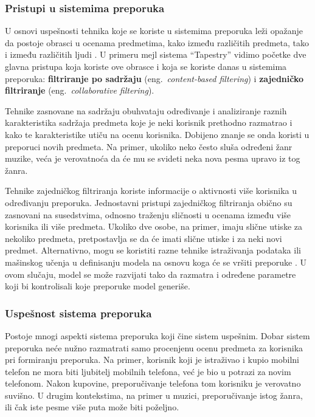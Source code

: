 \documentclass[a4paper]{article}
\begin{document}
\subsubsection{Pristupi u sistemima preporuka}
\label{subsubsec:pristupi_sistema_preporuka}

U osnovi uspešnosti tehnika koje se koriste u sistemima preporuka leži opažanje da postoje obrasci u ocenama predmetima, kako između različitih predmeta, tako i između različitih ljudi \cite{aggarwal_recommender_2016}. U primeru mejl sistema ``Tapestry'' vidimo početke dve glavna pristupa koja koriste ove obrasce i koja se koriste danas u sistemima preporuka: \textbf{filtriranje po sadržaju} (eng.~{\em content-based filtering}) i \textbf{zajedničko filtriranje} (eng.~{\em collaborative filtering}).

Tehnike zasnovane na sadržaju obuhvataju određivanje i analiziranje raznih karakteristika sadržaja predmeta koje je neki korisnik prethodno razmatrao i kako te karakteristike utiču na ocenu korisnika. Dobijeno znanje se onda koristi u preporuci novih predmeta. Na primer, ukoliko neko često sluša određeni žanr muzike, veća je verovatnoća da će mu se svideti neka nova pesma upravo iz tog žanra.

Tehnike zajedničkog filtriranja koriste informacije o aktivnosti više korisnika u određivanju preporuka. Jednostavni pristupi zajedničkog filtriranja obično su zasnovani na susedstvima, odnosno traženju sličnosti u ocenama između više korisnika ili više predmeta. Ukoliko dve osobe, na primer,  imaju slične utiske za nekoliko predmeta, pretpostavlja se da će imati slične utiske i za neki novi predmet. Alternativno, mogu se koristiti razne tehnike istraživanja podataka ili mašinskog učenja u definisanju modela na osnovu koga će se vršiti preporuke \cite{aggarwal_recommender_2016}. U ovom slučaju, model se može razvijati tako da razmatra i određene parametre koji bi kontrolisali koje preporuke model generiše.

\subsubsection{Uspešnost sistema preporuka}
\label{subsubsec:uspesnost_sistema_preporuka}

Postoje mnogi aspekti sistema preporuka koji čine sistem uspešnim. Dobar sistem preporuka neće nužno razmatrati samo procenjenu ocenu predmeta za korisnika pri formiranju preporuka. Na primer, korisnik koji je istraživao i kupio mobilni telefon ne mora biti ljubitelj mobilnih telefona, već je bio u potrazi za novim telefonom. Nakon kupovine, preporučivanje telefona tom korisniku je verovatno suvišno. U drugim kontekstima, na primer u muzici, preporučivanje istog žanra, ili čak iste pesme više puta može biti poželjno.
\end{document}
